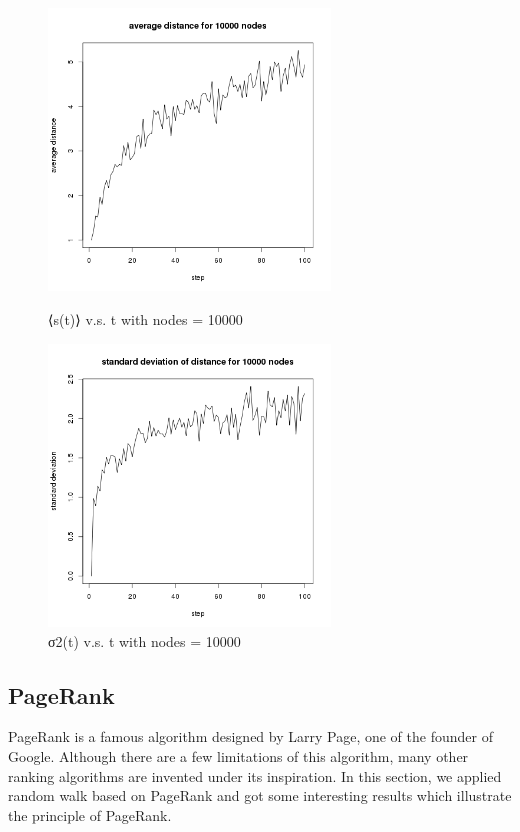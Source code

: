 \documentclass[draftcls,12pt,onecolumn]{IEEEtran}
\begin{document}
\begin{figure}[htbp]
\centering
\begin{minipage}[t]{0.48\textwidth}
\centering
\includegraphics[width=7.5cm]{2_2_d_10000_distance.png}
\caption{⟨s(t)⟩ v.s. t with nodes = 10000}
\end{minipage}
\begin{minipage}[t]{0.48\textwidth}
\centering
\includegraphics[width=7.5cm]{2_2_d_10000_deviation.png}
\caption{σ2(t) v.s. t with nodes = 10000}
\end{minipage}
\end{figure}







\subsection{PageRank}
PageRank is a famous algorithm designed by Larry Page, one of the founder of Google. Although there are a few limitations of this algorithm, many other ranking algorithms are invented under its inspiration. In this section, we applied random walk based on PageRank and got some interesting results which illustrate the principle of PageRank.
\end{document}
